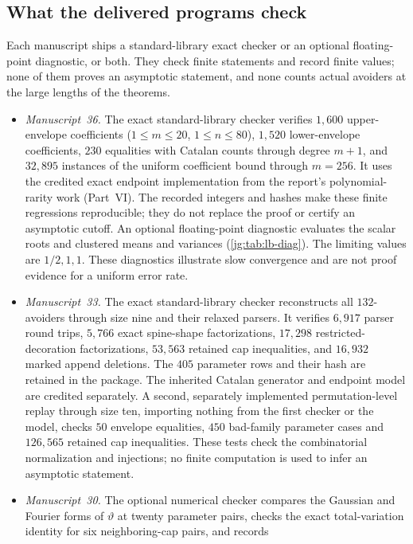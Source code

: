 \documentclass[11pt,a4paper]{article}
\theoremstyle{definition}\newaliascnt{definition}{theorem}
\theoremstyle{remark}\newaliascnt{remark}{theorem}
\begin{document}
\subsection{What the delivered programs check}
\label{jg:sec:checks-list}
Each manuscript ships a standard-library exact checker or an optional
floating-point diagnostic, or both. They check finite statements and record
finite values; none of them proves an asymptotic statement, and none counts
actual avoiders at the large lengths of the theorems.
\begin{itemize}
\item \emph{Manuscript~36.} The exact standard-library checker verifies
 $1{,}600$ upper-envelope coefficients ($1\le m\le20$, $1\le n\le80$),
 $1{,}520$ lower-envelope coefficients, $230$ equalities with Catalan counts
 through degree $m+1$, and $32{,}895$ instances of the uniform coefficient bound
 through $m=256$. It uses the credited exact endpoint implementation from the
 report's polynomial-rarity work (Part~VI). The recorded integers and hashes make
 these finite regressions reproducible; they do not replace the proof or certify
 an asymptotic cutoff. An optional floating-point diagnostic evaluates the
 scalar roots and clustered means and variances (\cref{jg:tab:lb-diag}). The
 limiting values are $1/2,1,1$. These diagnostics illustrate slow convergence
 and are not proof evidence for a uniform error rate.
\item \emph{Manuscript~33.} The exact standard-library checker reconstructs all
 $132$-avoiders through size nine and their relaxed parsers. It verifies
 $6{,}917$ parser round trips, $5{,}766$ exact spine-shape factorizations,
 $17{,}298$ restricted-decoration factorizations, $53{,}563$ retained cap
 inequalities, and $16{,}932$ marked append deletions. The $405$ parameter rows
 and their hash are retained in the package. The inherited Catalan generator and
 endpoint model are credited separately. A second, separately implemented
 permutation-level replay through size ten, importing nothing from the first
 checker or the model, checks $50$ envelope equalities, $450$ bad-family
 parameter cases and $126{,}565$ retained cap inequalities. These tests check the
 combinatorial normalization and injections; no finite computation is used to
 infer an asymptotic statement.
\item \emph{Manuscript~30.} The optional numerical checker compares the Gaussian
 and Fourier forms of $\vartheta$ at twenty parameter pairs, checks the exact
 total-variation identity for six neighboring-cap pairs, and records

\end{itemize}
\end{document}
